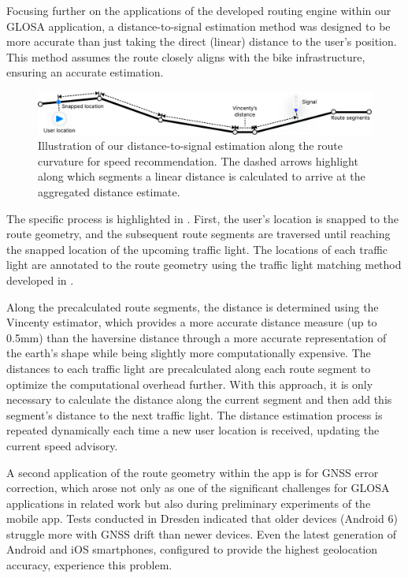 Focusing further on the applications of the developed routing engine within our GLOSA application, a distance-to-signal estimation method was designed to be more accurate than just taking the direct (linear) distance to the user's position. This method assumes the route closely aligns with the bike infrastructure, ensuring an accurate estimation.

\begin{figure}[t]
\centering
\includegraphics[width=\linewidth]{images/distance-to-signal-estimation.pdf}
\caption{Illustration of our distance-to-signal estimation along the route curvature for speed recommendation. The dashed arrows highlight along which segments a linear distance is calculated to arrive at the aggregated distance estimate.}
\label{fig:distance-to-signal-estimation}
\end{figure}

The specific process is highlighted in . First, the user's location is snapped to the route geometry, and the subsequent route segments are traversed until reaching the snapped location of the upcoming traffic light. The locations of each traffic light are annotated to the route geometry using the traffic light matching method developed in .

Along the precalculated route segments, the distance is determined using the Vincenty estimator, which provides a more accurate distance measure (up to 0.5mm) than the haversine distance through a more accurate representation of the earth's shape while being slightly more computationally expensive. The distances to each traffic light are precalculated along each route segment to optimize the computational overhead further. With this approach, it is only necessary to calculate the distance along the current segment and then add this segment's distance to the next traffic light. The distance estimation process is repeated dynamically each time a new user location is received, updating the current speed advisory.

A second application of the route geometry within the app is for GNSS error correction, which arose not only as one of the significant challenges for GLOSA applications in related work but also during preliminary experiments of the mobile app. Tests conducted in Dresden indicated that older devices (Android 6) struggle more with GNSS drift than newer devices. Even the latest generation of Android and iOS smartphones, configured to provide the highest geolocation accuracy, experience this problem.

